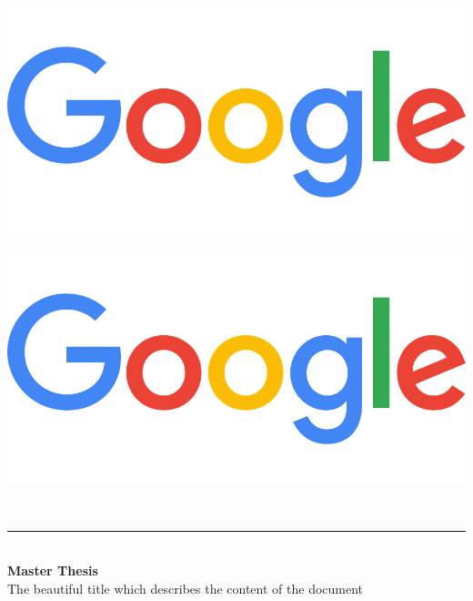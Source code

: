 \begin{titlepage}


\begin{center}

	\begin{minipage}{1\textwidth}
		\includegraphics[width=1\textwidth]{logos/logo.png}\\
	\end{minipage}

	\begin{minipage}{1\textwidth}
		\begin{center}
			\includegraphics[width=.7\textwidth]{logos/logo.png}\\[1cm]
		\end{center}
	\end{minipage}


	\\[.7cm]

        \begin{minipage}{0.8\textwidth} \begin{center}
        \rule{1\textwidth}{.1pt}\\%

        {\Large \textbf{Master Thesis}\\[.5cm]\Huge\og\color{rikenBlue}The beautiful title which describes the content of the document\fg{}}\\[0.3cm]


\end{center}
\end{minipage}
\end{center}
\end{titlepage}
